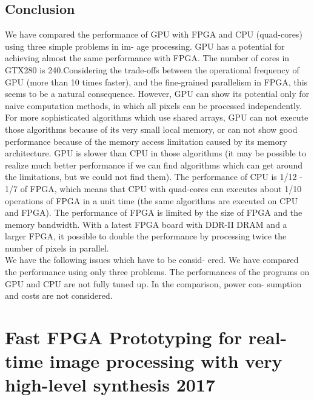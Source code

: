 \subsection{Conclusion}
\indent We have compared the performance of GPU with FPGA
and CPU (quad-cores) using three simple problems in im-
age processing. GPU has a potential for achieving almost
the same performance with FPGA. The number of cores in
GTX280 is 240.Considering the trade-offs between the operational frequency of GPU (more than 10 times faster), and
the fine-grained parallelism in FPGA, this seems to be a
natural consequence. However, GPU can show its potential
only for naive computation methods, in which all pixels can
be processed independently. For more sophisticated algorithms  
which use shared arrays, GPU can not execute those
algorithms because of its very small local memory, or can
not show good performance because of the memory access
limitation caused by its memory architecture. GPU is slower
than CPU in those algorithms (it may be possible to realize
much better performance if we can find algorithms which
can get around the limitations, but we could not find them).
The performance of CPU is 1/12 - 1/7 of FPGA, which
means that CPU with quad-cores can executes about 1/10
operations of FPGA in a unit time (the same algorithms are
executed on CPU and FPGA). The performance of FPGA
is limited by the size of FPGA and the memory bandwidth.
With a latest FPGA board with DDR-II DRAM and a larger
FPGA, it possible to double the performance by processing
twice the number of pixels in parallel.\\
\indent We have the following issues which have to be consid-
ered. We have compared the performance using only three
problems. The performances of the programs on GPU and
CPU are not fully tuned up. In the comparison, power con-
sumption and costs are not considered.

\section{Fast FPGA Prototyping for real-time image processing with very high-level synthesis 2017}
